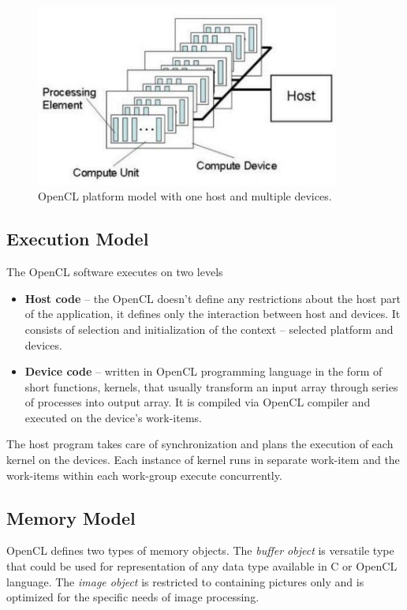 \begin{figure}[H]
\centering
\includegraphics[width=10cm]{fig/opencl_platform_model.jpg}
\caption[OpenCL platform model]{OpenCL platform model with one host and multiple
devices\cite{opencl}.}
\label{oclpm}
\end{figure}


\subsection{Execution Model}
The OpenCL software executes on two levels
\begin{itemize}
\item \textbf{Host code} -- the OpenCL doesn't define any restrictions about the 
host part of the application, it defines only the interaction between host and 
devices. It consists of selection and initialization of the context -- selected 
platform and devices.
\item \textbf{Device code} -- written in OpenCL programming language in the form
of short functions, kernels, that usually transform an input array through 
series of processes into output array. It is compiled via OpenCL compiler and 
executed on the device's work-items.
\end{itemize}

The host program takes care of synchronization and plans the execution of each
kernel on the devices. Each instance of kernel runs in separate work-item and 
the work-items within each work-group execute concurrently. 

\subsection{Memory Model}
OpenCL defines two types of memory objects. The \textit{buffer object} is
versatile type that could be used for representation of any data type 
available in C or OpenCL language. The \textit{image object} is restricted 
to containing pictures only and is optimized for the specific needs of 
image processing.

